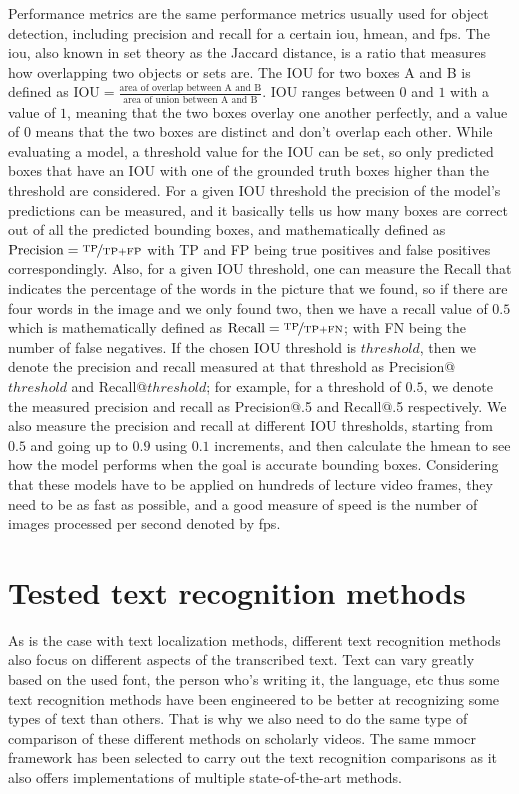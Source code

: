 Performance metrics are the same performance metrics usually used for object detection, including precision and recall for a certain \gls{iou}, \gls{hmean}, and \gls{fps}. The \gls{iou}, also known in set theory as the Jaccard distance, is a ratio that measures how overlapping two objects or sets are. The IOU for two boxes A and B is defined as $\text{IOU} = \frac{\text{area of overlap between A and B}}{\text{area of union between A and B}}$. IOU ranges between $0$ and $1$ with a value of $1$, meaning that the two boxes overlay one another perfectly, and a value of $0$ means that the two boxes are distinct and don't overlap each other. While evaluating a model, a threshold value for the IOU can be set, so only predicted boxes that have an IOU with one of the grounded truth boxes higher than the threshold are considered. For a given IOU threshold the precision of the model's predictions can be measured, and it basically tells us how many boxes are correct out of all the predicted bounding boxes, and mathematically defined as $\text{Precision} = \nicefrac{\text{TP}}{\text{TP} + \text{FP}}$ with TP and FP being true positives and false positives correspondingly. Also, for a given IOU threshold, one can measure the Recall that indicates the percentage of the words in the picture that we found, so if there are four words in the image and we only found two, then we have a recall value of $0.5$ which is mathematically defined as $\text{Recall} = \nicefrac{\text{TP}}{\text{TP} + \text{FN}}$; with FN being the number of false negatives. If the chosen IOU threshold is $threshold$, then we denote the precision and recall measured at that threshold as Precision@$threshold$ and Recall@$threshold$; for example, for a threshold of $0.5$, we denote the measured precision and recall as Precision@.5 and Recall@.5 respectively. We also measure the precision and recall at different IOU thresholds, starting from $0.5$ and going up to $0.9$ using $0.1$ increments, and then calculate the \gls{hmean} to see how the model performs when the goal is accurate bounding boxes. Considering that these models have to be applied on hundreds of lecture video frames, they need to be as fast as possible, and a good measure of speed is the number of images processed per second denoted by \gls{fps}.

\section{Tested text recognition methods}

As is the case with text localization methods, different text recognition methods also focus on different aspects of the transcribed text. Text can vary greatly based on the used font, the person who's writing it, the language, etc thus some text recognition methods have been engineered to be better at recognizing some types of text than others. That is why we also need to do the same type of comparison of these different methods on scholarly videos. The same \gls{mmocr} framework has been selected to carry out the text recognition comparisons as it also offers implementations of multiple state-of-the-art methods.

